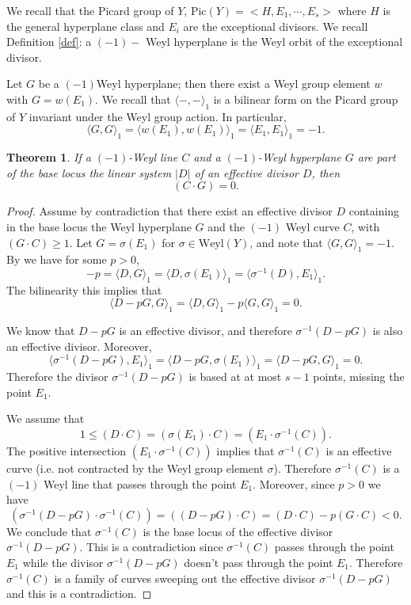 \documentclass[12pt]{article}
\newtheorem{theorem}[equation]{Theorem}
\numberwithin{equation}{section}
\numberwithin{subeq}{equation}
\begin{document}
We recall that the Picard group of $Y$, $\text{Pic}(Y)=<H, E_1,\cdots, E_s>$
where $H$ is the general hyperplane class and $E_i$ are the exceptional divisors.
We recall Definition \ref{def}:
a $(-1)-$ Weyl hyperplane is the Weyl orbit of the exceptional divisor.

Let $G$ be a  $(-1)$Weyl hyperplane;
then there exist a Weyl group element $w$ with $G=w(E_1)$. 
We recall that $\langle -, -\rangle_1$
is a bilinear form on the Picard group of $Y$ invariant under the Weyl group action.
In particular,
\[
\langle  G, G\rangle_1 = \langle w(E_1), w(E_1) \rangle_1= \langle E_1, E_1\rangle_1= - 1.
\]

\begin{theorem}\label{base locus 1}
If a $(-1)$-Weyl line $C$ and a $(-1)$-Weyl hyperplane $G$
are part of the base locus the linear system $|D|$ of an effective divisor $D$,
then
$$(C \cdot G)=0.$$
\end{theorem}

\begin{proof}
Assume by contradiction that there exist an effective divisor $D$
containing in the base locus the Weyl hyperplane $G$ and the $(-1)$ Weyl curve $C$,
with $(G \cdot C) \geq 1$.
Let $G=\sigma(E_1)$ for $\sigma \in \text{Weyl}(Y)$,
and note that $\langle G, G \rangle_1=-1$.
By \cite[Lemma 7.1]{DP} we have for some $p>0$,
\[
-p= \langle D, G\rangle_1 = \langle D, \sigma(E_1)\rangle_1 = \langle \sigma^{-1}(D), E_1 \rangle_1.
\]
The bilinearity this implies that
$$\langle D-pG, G \rangle_1 = \langle D, G\rangle_1 -p \langle G, G\rangle_1=0.$$

We know that $D-pG$ is an effective divisor,
and therefore $\sigma^{-1}(D-pG)$ is also an effective divisor. 
Moreover,
$$ \langle \sigma^{-1}(D - p G), E_1\rangle_1 = \langle D - pG, \sigma(E_1)\rangle_1 =\langle  D - p G, G\rangle_1=0.
$$
Therefore the divisor $\sigma^{-1}(D - p G)$ is based at at most $s-1$ points,
missing the point $E_1$.

We assume that 
$$
1\leq (D \cdot C) = (\sigma(E_1) \cdot C) = (E_1 \cdot \sigma^{-1}(C)).
$$
The positive intersection $(E_1 \cdot \sigma^{-1}(C))$
implies that $\sigma^{-1}(C)$ is an effective curve
(i.e. not contracted by the Weyl group element $\sigma$).
Therefore $\sigma^{-1}(C)$ is a $(-1)$ Weyl line that
passes through the point $E_1$.
Moreover, since $p>0$ we have
$$
(\sigma^{-1}(D - p G) \cdot \sigma^{-1}(C)) = ((D - p G) \cdot C)
= (D\cdot C) - p (G \cdot C) <0.
$$
We conclude that $\sigma^{-1}(C)$
is the base locus of the effective divisor $\sigma^{-1}(D - p G)$.
This is a contradiction since $\sigma^{-1}(C)$ passes through the point $E_1$
while the divisor $\sigma^{-1}(D - p G)$ doesn't pass through the point $E_1$.
Therefore $\sigma^{-1}(C)$ is a family of curves 
sweeping out the effective divisor $\sigma^{-1}(D - p G)$ and this is a contradiction.
\end{proof}
\end{document}
